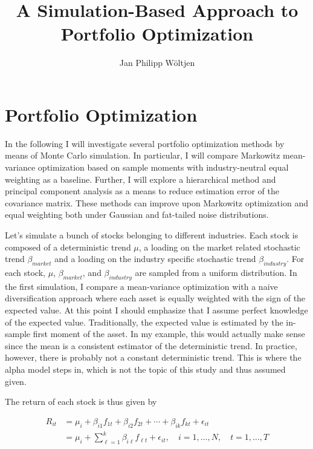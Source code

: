 \documentclass[11pt]{article}
\title{A Simulation-Based Approach to Portfolio Optimization}
\author{Jan Philipp Wöltjen}
\begin{document}
    
    
    \maketitle
    
    

    
    \hypertarget{portfolio-optimization}{%
\section{Portfolio Optimization}\label{portfolio-optimization}}

    In the following I will investigate several portfolio optimization
methods by means of Monte Carlo simulation. In particular, I will
compare Markowitz mean-variance optimization based on sample moments
with industry-neutral equal weighting as a baseline. Further, I will
explore a hierarchical method and principal component analysis as a
means to reduce estimation error of the covariance matrix. These methods
can improve upon Markowitz optimization and equal weighting both under
Gaussian and fat-tailed noise distributions.

Let's simulate a bunch of stocks belonging to different industries. Each
stock is composed of a deterministic trend \(\mu\), a loading on the
market related stochastic trend \(\beta_{market}\) and a loading on the
industry specific stochastic trend \(\beta_{industry}\). For each stock,
\(\mu\), \(\beta_{market}\), and \(\beta_{industry}\) are sampled from a
uniform distribution. In the first simulation, I compare a mean-variance
optimization with a naive diversification approach where each asset is
equally weighted with the sign of the expected value. At this point I
should emphasize that I assume perfect knowledge of the expected value.
Traditionally, the expected value is estimated by the in-sample first
moment of the asset. In my example, this would actually make sense since
the mean is a consistent estimator of the deterministic trend. In
practice, however, there is probably not a constant deterministic trend.
This is where the alpha model steps in, which is not the topic of this
study and thus assumed given.

The return of each stock is thus given by

\[\begin{aligned} R_{i t} &=\mu_{i}+\beta_{i 1} f_{1 t}+\beta_{i 2} f_{2 t}+\cdots+\beta_{i k} f_{k t}+\epsilon_{i t} \\ &=\mu_{i}+\sum_{\ell=1}^{k} \beta_{i \ell} f_{\ell t}+\epsilon_{i t}, \quad i=1, \ldots, N, \quad t=1, \ldots, T \end{aligned}\]
\end{document}
